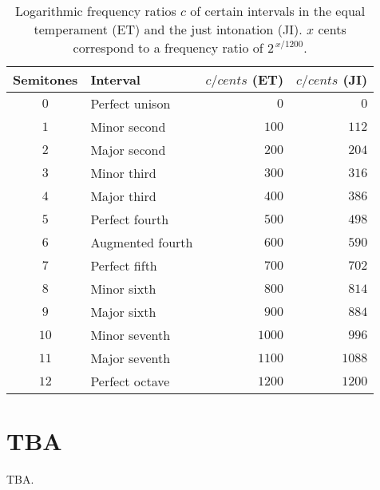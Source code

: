 \begin{table}[t]
  \centering
  \begin{tabular}{c l r r}
    \toprule
    Semitones & Interval & $c/\unit{cents}$ (ET) & $c/\unit{cents}$ (JI) \\
    \midrule
    $0$ & Perfect unison & $0$ & $0$ \\
    $1$ & Minor second & $100$ & $112$ \\
    $2$ & Major second & $200$ & $204$ \\
    $3$ & Minor third & $300$ & $316$ \\
    $4$ & Major third & $400$ & $386$ \\
    $5$ & Perfect fourth & $500$ & $498$ \\
    $6$ & Augmented fourth & $600$ & $590$ \\
    $7$ & Perfect fifth & $700$ & $702$ \\
    $8$ & Minor sixth & $800$ & $814$ \\
    $9$ & Major sixth & $900$ & $884$ \\
    $10$ & Minor seventh & $1000$ & $996$ \\
    $11$ & Major seventh & $1100$ & $1088$ \\
    $12$ & Perfect octave & $1200$ & $1200$ \\
    \bottomrule
  \end{tabular}
  \caption{Logarithmic frequency ratios $c$ of certain intervals in the equal temperament (ET) and the just intonation (JI). $x$ cents correspond to a frequency ratio of $2^{\, x/1200}$.}
  \label{tab:2:cents}
\end{table}


\section{TBA}

TBA.